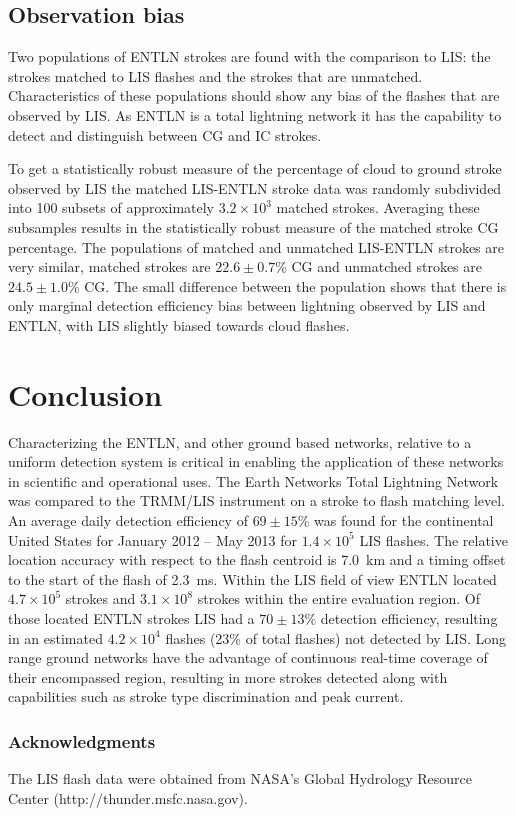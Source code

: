 \subsection{Observation bias}

Two populations of ENTLN strokes are found with the comparison to LIS: the strokes matched to LIS flashes and the strokes that are unmatched.
Characteristics of these populations should show any bias of the flashes that are observed by LIS.
As ENTLN is a total lightning network it has the capability to detect and distinguish between CG and IC strokes.

To get a statistically robust measure of the percentage of cloud to ground stroke observed by LIS the matched LIS-ENTLN stroke data was randomly subdivided into 100 subsets of approximately $3.2\times10^3$ matched strokes.
Averaging these subsamples results in the statistically robust measure of the matched stroke CG percentage.
The populations of matched and unmatched LIS-ENTLN strokes are very similar, matched strokes are $22.6\pm0.7$\% CG and unmatched strokes are $24.5\pm1.0$\% CG.
The small difference between the population shows that there is only marginal detection efficiency bias between lightning observed by LIS and ENTLN, with LIS slightly biased towards cloud flashes.

\section{Conclusion}

Characterizing the ENTLN, and other ground based networks, relative to a uniform detection system is critical in enabling the application of these networks in scientific and operational uses.
The Earth Networks Total Lightning Network was compared to the TRMM/LIS instrument on a stroke to flash matching level.
An average daily detection efficiency of $69\pm 15$\% was found for the continental United States for January 2012 -- May 2013 for $1.4 \times 10^5$ LIS flashes.
The relative location accuracy with respect to the flash centroid is 7.0~km and a timing offset to the start of the flash of 2.3~ms.
Within the LIS field of view ENTLN located $4.7\times 10^5$ strokes and $3.1\times10^8$ strokes within the entire evaluation region.
Of those located ENTLN strokes LIS had a $70 \pm 13$\% detection efficiency, resulting in an estimated $4.2 \times 10^4$ flashes (23\% of total flashes) not detected by LIS.
Long range ground networks have the advantage of continuous real-time coverage of their encompassed region, resulting in more strokes detected along with capabilities such as stroke type discrimination and peak current.

\subsubsection*{Acknowledgments}

The LIS flash data were obtained from NASA's Global Hydrology Resource Center (http://thunder.msfc.nasa.gov).
